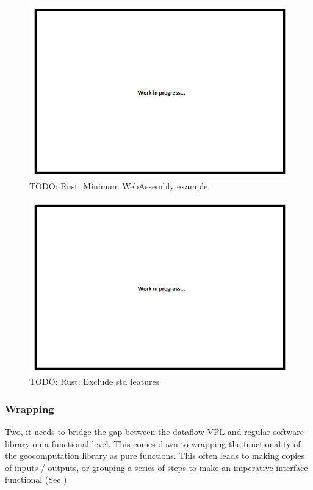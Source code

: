 \begin{figure}
  \centering
  \graphicspath{ {../../assets/images/misc/} }
  \includegraphics[width=\linewidth]{placeholder.png}
  \caption{TODO: Rust: Minimum WebAssembly example}
  \label{fig:minimum-rust-wasm}
\end{figure}

\begin{figure}
  \centering
  \graphicspath{ {../../assets/images/misc/} }
  \includegraphics[width=\linewidth]{placeholder.png}
  \caption{TODO: Rust: Exclude std features}
  \label{fig:minimum-rust-wasm-no-std}
\end{figure}

\subsubsection{Wrapping}

Two, it needs to bridge the gap between the dataflow-VPL and regular software library on a functional level. 
This comes down to wrapping the functionality of the geocomputation library as pure functions. 
This often leads to making copies of inputs / outputs, or grouping a series of steps to make an imperative interface functional (See )

